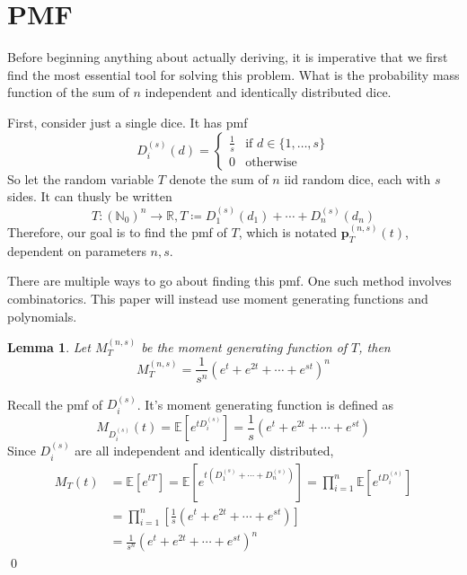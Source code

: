 \documentclass[a4paper]{article}
\newtheorem{lemma}{Lemma}
\renewenvironment{proof}{{\bfseries Proof}}{\qed}
\begin{document}
\section{PMF}

Before beginning anything about actually deriving, it is imperative that we first find the most essential tool for solving this problem. What is the probability mass function of the sum of $n$ independent and identically distributed dice.

First, consider just a single dice. It has pmf
%
$$
D_{i}^{(s)}(d) = \begin{cases}
    \frac{1}{s} & \text{if } d \in \{1, \ldots, s \} \\
    0 & \text{otherwise}
\end{cases}
$$
%
So let the random variable $T$ denote the sum of $n$ iid random dice, each with $s$ sides. It can thusly be written
%
$$ 
T: \left(\mathbb{N}_{0}\right)^n \to \mathbb{R}, T \coloneqq D_{1}^{(s)}(d_1) + \cdots + D_{n}^{(s)}(d_n) 
$$
%
Therefore, our goal is to find the pmf of $T$, which is notated $\textbf{p}_{T}^{(n, s)}(t)$, dependent on parameters $n, s$. 

There are multiple ways to go about finding this pmf. One such method involves combinatorics. This paper will instead use moment generating functions and polynomials.


\begin{lemma}
    Let $M_{T}^{(n, s)}$ be the moment generating function of $T$, then 
    $$ M_{T}^{(n, s)} = \frac{1}{s^n} (e^{t} + e^{2t} + \cdots  + e^{st})^n $$
\end{lemma}


\begin{proof}
    Recall the pmf of $D_{i}^{(s)}$. It's moment generating function is defined as
    $$
    M_{D_{i}^{(s)}}(t) = \mathbb{E}[e^{tD_{i}^{(s)}}] = \frac{1}{s}(e^{t} + e^{2t} + \cdots + e^{st})
    $$
    Since $D_{i}^{(s)}$ are all independent and identically distributed,
    \begin{align*}
        M_{T}(t) &= \mathbb{E}[e^{tT}] = \mathbb{E}[e^{t(D_{1}^{(s)} + \cdots + D_{n}^{(s)})}] = \prod_{i = 1}^{n} \mathbb{E}[e^{tD_{i}^{(s)}}] \\
        &= \prod_{i = 1}^{n} \left[\frac{1}{s}(e^{t} + e^{2t} + \cdots + e^{st}) \right] \\
        &= \frac{1}{s^n} (e^{t} + e^{2t} + \cdots + e^{st})^n
    \end{align*}
\end{proof}
\end{document}
